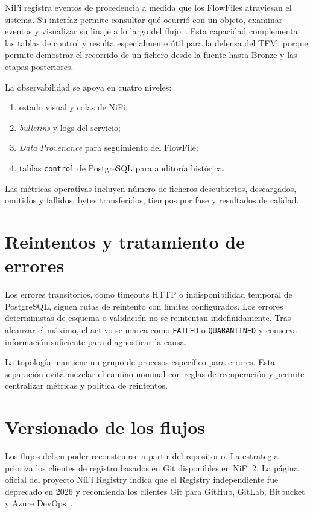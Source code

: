 NiFi registra eventos de procedencia a medida que los FlowFiles atraviesan el sistema. Su interfaz permite consultar qué ocurrió con un objeto, examinar eventos y visualizar su linaje a lo largo del flujo~\cite{nifi_user_guide}. Esta capacidad complementa las tablas de control y resulta especialmente útil para la defensa del TFM, porque permite demostrar el recorrido de un fichero desde la fuente hasta Bronze y las etapas posteriores.

La observabilidad se apoya en cuatro niveles:

\begin{enumerate}
\item estado visual y colas de NiFi;
\item \textit{bulletins} y logs del servicio;
\item \textit{Data Provenance} para seguimiento del FlowFile;
\item tablas \texttt{control} de PostgreSQL para auditoría histórica.
\end{enumerate}

Las métricas operativas incluyen número de ficheros descubiertos, descargados, omitidos y fallidos, bytes transferidos, tiempos por fase y resultados de calidad.

\section{Reintentos y tratamiento de errores}

Los errores transitorios, como timeouts HTTP o indisponibilidad temporal de PostgreSQL, siguen rutas de reintento con límites configurados. Los errores deterministas de esquema o validación no se reintentan indefinidamente. Tras alcanzar el máximo, el activo se marca como \texttt{FAILED} o \texttt{QUARANTINED} y conserva información suficiente para diagnosticar la causa.

La topología mantiene un grupo de procesos específico para errores. Esta separación evita mezclar el camino nominal con reglas de recuperación y permite centralizar métricas y política de reintentos.

\section{Versionado de los flujos}

Los flujos deben poder reconstruirse a partir del repositorio. La estrategia prioriza los clientes de registro basados en Git disponibles en NiFi 2. La página oficial del proyecto NiFi Registry indica que el Registry independiente fue deprecado en 2026 y recomienda los clientes Git para GitHub, GitLab, Bitbucket y Azure DevOps~\cite{nifi_registry}.

